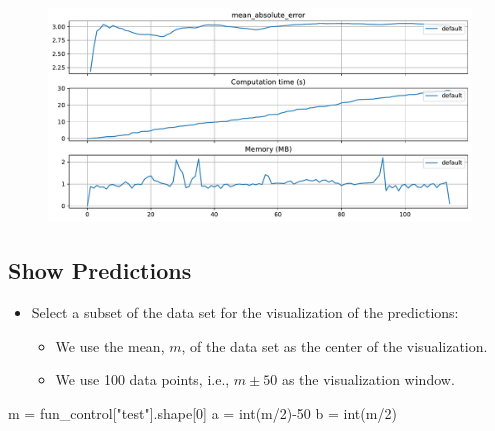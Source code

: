 \documentclass[
  letterpaper,
  DIV=11,
  numbers=noendperiod]{scrreprt}
\newenvironment{Shaded}{\begin{snugshade}}{\end{snugshade}}
\newcommand{\BuiltInTok}[1]{\textcolor[rgb]{0.00,0.23,0.31}{#1}}
\newcommand{\DecValTok}[1]{\textcolor[rgb]{0.68,0.00,0.00}{#1}}
\newcommand{\NormalTok}[1]{\textcolor[rgb]{0.00,0.23,0.31}{#1}}
\newcommand{\OperatorTok}[1]{\textcolor[rgb]{0.37,0.37,0.37}{#1}}
\newcommand{\StringTok}[1]{\textcolor[rgb]{0.13,0.47,0.30}{#1}}
\providecommand{\tightlist}{%
  \setlength{\itemsep}{0pt}\setlength{\parskip}{0pt}}\usepackage{longtable,booktabs,array}
\begin{document}
\begin{figure}[H]

{\centering \includegraphics{13_spot_hpt_river_files/figure-pdf/cell-29-output-1.pdf}

}

\end{figure}

\hypertarget{show-predictions}{%
\subsection{Show Predictions}\label{show-predictions}}

\begin{itemize}
\tightlist
\item
  Select a subset of the data set for the visualization of the
  predictions:

  \begin{itemize}
  \tightlist
  \item
    We use the mean, \(m\), of the data set as the center of the
    visualization.
  \item
    We use 100 data points, i.e., \(m \pm 50\) as the visualization
    window.
  \end{itemize}
\end{itemize}

\begin{Shaded}
\begin{Highlighting}[]
\NormalTok{m }\OperatorTok{=}\NormalTok{ fun\_control[}\StringTok{"test"}\NormalTok{].shape[}\DecValTok{0}\NormalTok{]}
\NormalTok{a }\OperatorTok{=} \BuiltInTok{int}\NormalTok{(m}\OperatorTok{/}\DecValTok{2}\NormalTok{)}\OperatorTok{{-}}\DecValTok{50}
\NormalTok{b }\OperatorTok{=} \BuiltInTok{int}\NormalTok{(m}\OperatorTok{/}\DecValTok{2}\NormalTok{)}
\end{Highlighting}
\end{Shaded}
\end{document}

